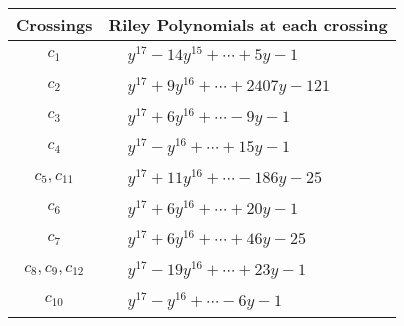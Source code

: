 \documentclass[1p]{elsarticle_modified}
\theoremstyle{definition}
\begin{document}
\begin{tabular}{m{50pt}|m{274pt}}
Crossings & \hspace{64pt}Riley Polynomials at each crossing \\
\hline $$\begin{aligned}c_{1}\end{aligned}$$&$\begin{aligned}
&y^{17}-14 y^{15}+\cdots+5 y-1
\end{aligned}$\\
\hline $$\begin{aligned}c_{2}\end{aligned}$$&$\begin{aligned}
&y^{17}+9 y^{16}+\cdots+2407 y-121
\end{aligned}$\\
\hline $$\begin{aligned}c_{3}\end{aligned}$$&$\begin{aligned}
&y^{17}+6 y^{16}+\cdots-9 y-1
\end{aligned}$\\
\hline $$\begin{aligned}c_{4}\end{aligned}$$&$\begin{aligned}
&y^{17}- y^{16}+\cdots+15 y-1
\end{aligned}$\\
\hline $$\begin{aligned}c_{5},c_{11}\end{aligned}$$&$\begin{aligned}
&y^{17}+11 y^{16}+\cdots-186 y-25
\end{aligned}$\\
\hline $$\begin{aligned}c_{6}\end{aligned}$$&$\begin{aligned}
&y^{17}+6 y^{16}+\cdots+20 y-1
\end{aligned}$\\
\hline $$\begin{aligned}c_{7}\end{aligned}$$&$\begin{aligned}
&y^{17}+6 y^{16}+\cdots+46 y-25
\end{aligned}$\\
\hline $$\begin{aligned}c_{8},c_{9},c_{12}\end{aligned}$$&$\begin{aligned}
&y^{17}-19 y^{16}+\cdots+23 y-1
\end{aligned}$\\
\hline $$\begin{aligned}c_{10}\end{aligned}$$&$\begin{aligned}
&y^{17}- y^{16}+\cdots-6 y-1
\end{aligned}$\\
\hline
\end{tabular}\\~\\
\end{document}
